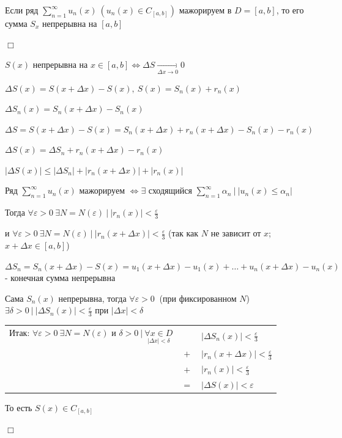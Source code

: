 \documentclass[12pt]{article}
\begin{document}
    \begin{MyTheorem}
        \Ths Если ряд $\sum_{n = 1}^\infty u_n(x) \ (u_n(x) \in C_{[a, b]})$ мажорируем в $D = [a, b]$, то 
        его сумма $S_x$ непрерывна на $[a, b]$
    \end{MyTheorem}

    \begin{MyProof}
        $\Box$

        $S(x)$ непрерывна на $x \in [a, b] \Longleftrightarrow \Delta S \underset{\Delta x \to 0}{\rightarrow} 0$

        $\Delta S(x) = S(x + \Delta x) - S(x), \ S(x) = S_n(x) + r_n(x)$

        $\Delta S_n(x) = S_n(x + \Delta x) - S_n(x)$

        $\Delta S = S(x + \Delta x) - S(x) = S_n(x + \Delta x) + r_n(x +  \Delta x) - S_n(x) - r_n(x)$

        $\Delta S(x) = \Delta S_n + r_n(x + \Delta x) - r_n(x)$

        $|\Delta S(x)| \leq |\Delta S_n| + |r_n(x + \Delta x)| + |r_n(x)|$

        Ряд $\sum_{n = 1}^\infty u_n(x)$ мажорируем $\Longleftrightarrow \exists$ сходящийся $\sum_{n = 1}^\infty \alpha_n \ \Big| \ |u_n(x) \leq \alpha_n|$
    
        Тогда $\forall \varepsilon > 0 \ \exists N = N(\varepsilon) \ | \ |r_n(x)| < \frac{\varepsilon}{3}$

        и $\forall \varepsilon > 0 \ \exists N = N(\varepsilon) \ | \ |r_n(x + \Delta x)| < \frac{\varepsilon}{3}$ (так как $N$ не зависит от $x$; $x + \Delta x \in [a, b]$) 
    
        $\Delta S_n = S_n(x + \Delta x) - S(x) = u_1(x + \Delta x) - u_1(x) + \dots + u_n(x + \Delta x) - u_n(x)$ - конечная сумма непрерывна

        Сама $S_n(x)$ непрерывна, тогда $\forall \varepsilon > 0 \ $ (при фиксированном $N$) $\exists \delta > 0 \ | \ |\Delta S_n(x)| < \frac{\varepsilon}{3}$ при $|\Delta x| < \delta$

        \bgroup
        \setlength\tabcolsep{1.5pt}
        \begin{tabular}{ccl}
            Итак: $\forall \varepsilon > 0 \ \exists N = N(\varepsilon)$ и $\delta > 0 \ | \ \underset{|\Delta x| < \delta}{\forall x \in D}$ & & $|\Delta S_n(x)| < \frac{\varepsilon}{3}$ \\
            
            & $+$ & $|r_n(x + \Delta x)| < \frac{\varepsilon}{3}$ \\ 
            
            & $+$ & $|r_n(x)| < \frac{\varepsilon}{3}$ \\

            & $=$ & $|\Delta S(x)| < \varepsilon$
        \end{tabular}
        \egroup

        То есть $S(x) \in C_{[a, b]}$

        $\Box$
    \end{MyProof}
\end{document}
